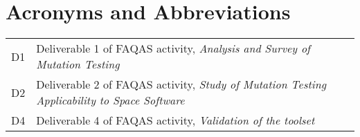 
\section{Acronyms and Abbreviations}
\label{sec:acronyms}


\begin{tabular}{|p{1.5cm}|p{14.5cm}|}

D1& Deliverable 1 of FAQAS activity, \emph{Analysis and Survey of Mutation Testing}\\
D2& Deliverable 2 of FAQAS activity, \emph{Study of Mutation Testing Applicability to Space Software}\\
D4& Deliverable 4 of FAQAS activity, \emph{Validation of the toolset}\\


                                                           
\end{tabular}
\normalsize

\clearpage